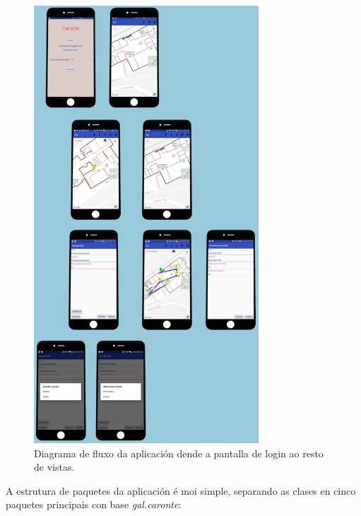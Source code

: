 \begin{figure}[h!]
	\begin{center}
		\includegraphics[width=0.75\textwidth]{figures/Capturas/fluxoAplicacion}
		\caption{Diagrama de fluxo da aplicación dende a pantalla de login ao resto de vistas.}
		\label{fig:fluxoAplicacion}
	\end{center}
\end{figure}

A estrutura de paquetes da aplicación é moi simple, separando as clases en cinco paquetes principais con base \emph{gal.caronte}:

